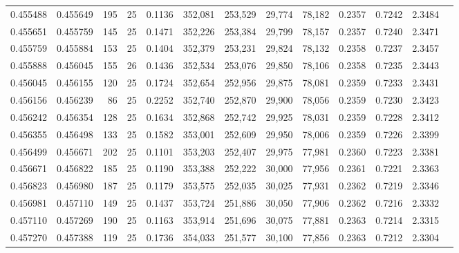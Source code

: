 \begin{tabular}{rrrrrrrrrrrrr}
0.455488 & 0.455649 &   195 &  25 &                                     0.1136 & 352,081 & 253,529 &  29,774 &  78,182 & 0.2357 & 0.7242 & 2.3484 \\
0.455651 & 0.455759 &   145 &  25 &                                     0.1471 & 352,226 & 253,384 &  29,799 &  78,157 & 0.2357 & 0.7240 & 2.3471 \\
0.455759 & 0.455884 &   153 &  25 &                                     0.1404 & 352,379 & 253,231 &  29,824 &  78,132 & 0.2358 & 0.7237 & 2.3457 \\
0.455888 & 0.456045 &   155 &  26 &                                     0.1436 & 352,534 & 253,076 &  29,850 &  78,106 & 0.2358 & 0.7235 & 2.3443 \\
0.456045 & 0.456155 &   120 &  25 &                                     0.1724 & 352,654 & 252,956 &  29,875 &  78,081 & 0.2359 & 0.7233 & 2.3431 \\
0.456156 & 0.456239 &    86 &  25 &                                     0.2252 & 352,740 & 252,870 &  29,900 &  78,056 & 0.2359 & 0.7230 & 2.3423 \\
0.456242 & 0.456354 &   128 &  25 &                                     0.1634 & 352,868 & 252,742 &  29,925 &  78,031 & 0.2359 & 0.7228 & 2.3412 \\
0.456355 & 0.456498 &   133 &  25 &                                     0.1582 & 353,001 & 252,609 &  29,950 &  78,006 & 0.2359 & 0.7226 & 2.3399 \\
0.456499 & 0.456671 &   202 &  25 &                                     0.1101 & 353,203 & 252,407 &  29,975 &  77,981 & 0.2360 & 0.7223 & 2.3381 \\
0.456671 & 0.456822 &   185 &  25 &                                     0.1190 & 353,388 & 252,222 &  30,000 &  77,956 & 0.2361 & 0.7221 & 2.3363 \\
0.456823 & 0.456980 &   187 &  25 &                                     0.1179 & 353,575 & 252,035 &  30,025 &  77,931 & 0.2362 & 0.7219 & 2.3346 \\
0.456981 & 0.457110 &   149 &  25 &                                     0.1437 & 353,724 & 251,886 &  30,050 &  77,906 & 0.2362 & 0.7216 & 2.3332 \\
0.457110 & 0.457269 &   190 &  25 &                                     0.1163 & 353,914 & 251,696 &  30,075 &  77,881 & 0.2363 & 0.7214 & 2.3315 \\
0.457270 & 0.457388 &   119 &  25 &                                     0.1736 & 354,033 & 251,577 &  30,100 &  77,856 & 0.2363 & 0.7212 & 2.3304 \\

\end{tabular}
